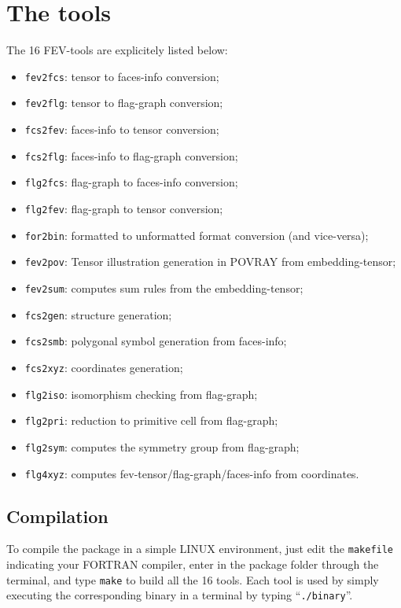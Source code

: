 \documentclass{scrreprt}
\begin{document}
\section{The tools}
The 16 FEV-tools are explicitely listed below:
\begin{itemize}
 \item \verb-fev2fcs-: tensor to faces-info conversion; 
 \item \verb-fev2flg-: tensor to flag-graph conversion;
 \item \verb-fcs2fev-: faces-info to tensor conversion;
 \item \verb-fcs2flg-: faces-info to flag-graph conversion; 
 \item \verb-flg2fcs-: flag-graph to faces-info conversion; 
 \item \verb-flg2fev-: flag-graph to tensor conversion;
 \item \verb-for2bin-: formatted to unformatted format conversion (and vice-versa);
 \item \verb-fev2pov-: Tensor illustration generation in POVRAY from embedding-tensor; 
 \item \verb-fev2sum-: computes sum rules from the embedding-tensor;  
 \item \verb-fcs2gen-: structure generation;
 \item \verb-fcs2smb-: polygonal symbol generation from faces-info;
 \item \verb-fcs2xyz-: coordinates generation;
 \item \verb-flg2iso-: isomorphism checking from flag-graph; 
 \item \verb-flg2pri-: reduction to primitive cell from flag-graph;
 \item \verb-flg2sym-: computes the symmetry group from flag-graph;
 \item \verb-flg4xyz-: computes fev-tensor/flag-graph/faces-info from coordinates.
\end{itemize}


\subsection{Compilation}
To compile the package in a simple LINUX environment, just edit the \verb-makefile- indicating your \textsc{FORTRAN} compiler, enter in the package folder through the terminal, and type \verb-make- to build all the 16 tools. Each tool is used by simply executing the corresponding binary in a terminal by typing ``\verb-./binary-''.
\end{document}
